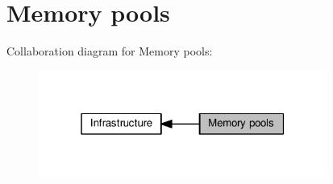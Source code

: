 \hypertarget{group__mempool}{}\section{Memory pools}
\label{group__mempool}
Collaboration diagram for Memory pools\+:
\nopagebreak
\begin{figure}[H]
\begin{center}
\leavevmode
\includegraphics[width=268pt]{group__mempool}
\end{center}
\end{figure}
